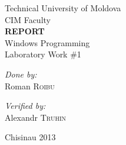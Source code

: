 \documentclass{report}
\begin{document}
\begin{center}

{\large Technical University of Moldova}\\[0.3cm]
{\large CIM Faculty}\\[4cm]

{\Huge \bfseries REPORT}\\[5cm]

{\LARGE Windows Programming}\\[0.5cm]
{\Large Laboratory Work \#1}\\[3cm]

\begin{minipage}{0.4\textwidth}
\begin{flushleft}
\large\emph{Done by:}\\
Roman \textsc{Roibu}
\end{flushleft}
\end{minipage}
\begin{minipage}{0.4\textwidth}
\begin{flushright}
\large\emph{Verified by:}\\
Alexandr \textsc{Truhin}
\end{flushright}
\end{minipage}

\vfill

{\small Chisinau 2013}

\end{center}
\end{document}
